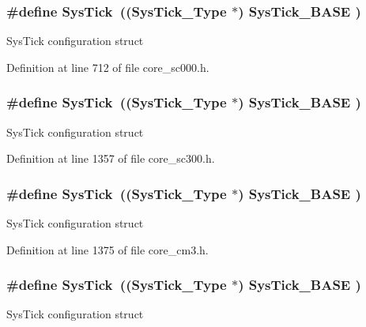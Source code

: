 \subsubsection[{\texorpdfstring{Sys\+Tick}{SysTick}}]{\setlength{\rightskip}{0pt plus 5cm}\#define Sys\+Tick~(({\bf Sys\+Tick\+\_\+\+Type}   $\ast$)     {\bf Sys\+Tick\+\_\+\+B\+A\+SE}  )}\hypertarget{group___c_m_s_i_s__core__base_gacd96c53beeaff8f603fcda425eb295de}{}\label{group___c_m_s_i_s__core__base_gacd96c53beeaff8f603fcda425eb295de}
Sys\+Tick configuration struct 

Definition at line 712 of file core\+\_\+sc000.\+h.

\subsubsection[{\texorpdfstring{Sys\+Tick}{SysTick}}]{\setlength{\rightskip}{0pt plus 5cm}\#define Sys\+Tick~(({\bf Sys\+Tick\+\_\+\+Type}   $\ast$)     {\bf Sys\+Tick\+\_\+\+B\+A\+SE}  )}\hypertarget{group___c_m_s_i_s__core__base_gacd96c53beeaff8f603fcda425eb295de}{}\label{group___c_m_s_i_s__core__base_gacd96c53beeaff8f603fcda425eb295de}
Sys\+Tick configuration struct 

Definition at line 1357 of file core\+\_\+sc300.\+h.

\subsubsection[{\texorpdfstring{Sys\+Tick}{SysTick}}]{\setlength{\rightskip}{0pt plus 5cm}\#define Sys\+Tick~(({\bf Sys\+Tick\+\_\+\+Type}   $\ast$)     {\bf Sys\+Tick\+\_\+\+B\+A\+SE}  )}\hypertarget{group___c_m_s_i_s__core__base_gacd96c53beeaff8f603fcda425eb295de}{}\label{group___c_m_s_i_s__core__base_gacd96c53beeaff8f603fcda425eb295de}
Sys\+Tick configuration struct 

Definition at line 1375 of file core\+\_\+cm3.\+h.

\subsubsection[{\texorpdfstring{Sys\+Tick}{SysTick}}]{\setlength{\rightskip}{0pt plus 5cm}\#define Sys\+Tick~(({\bf Sys\+Tick\+\_\+\+Type}   $\ast$)     {\bf Sys\+Tick\+\_\+\+B\+A\+SE}  )}\hypertarget{group___c_m_s_i_s__core__base_gacd96c53beeaff8f603fcda425eb295de}{}\label{group___c_m_s_i_s__core__base_gacd96c53beeaff8f603fcda425eb295de}
Sys\+Tick configuration struct 

